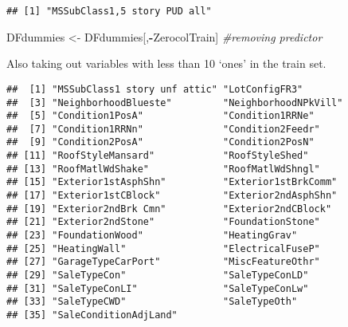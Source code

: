 \documentclass[]{article}
\newenvironment{Shaded}{\begin{snugshade}}{\end{snugshade}}
\newcommand{\CommentTok}[1]{\textcolor[rgb]{0.56,0.35,0.01}{\textit{#1}}}
\newcommand{\DecValTok}[1]{\textcolor[rgb]{0.00,0.00,0.81}{#1}}
\newcommand{\KeywordTok}[1]{\textcolor[rgb]{0.13,0.29,0.53}{\textbf{#1}}}
\newcommand{\NormalTok}[1]{#1}
\newcommand{\OperatorTok}[1]{\textcolor[rgb]{0.81,0.36,0.00}{\textbf{#1}}}
\newcommand{\StringTok}[1]{\textcolor[rgb]{0.31,0.60,0.02}{#1}}
\begin{document}
\begin{Shaded}
\end{Shaded}

\begin{verbatim}
## [1] "MSSubClass1,5 story PUD all"
\end{verbatim}

\begin{Shaded}
\begin{Highlighting}[]
\NormalTok{DFdummies <-}\StringTok{ }\NormalTok{DFdummies[,}\OperatorTok{-}\NormalTok{ZerocolTrain] }\CommentTok{#removing predictor}
\end{Highlighting}
\end{Shaded}

Also taking out variables with less than 10 `ones' in the train set.

\begin{Shaded}
\end{Shaded}

\begin{verbatim}
##  [1] "MSSubClass1 story unf attic" "LotConfigFR3"               
##  [3] "NeighborhoodBlueste"         "NeighborhoodNPkVill"        
##  [5] "Condition1PosA"              "Condition1RRNe"             
##  [7] "Condition1RRNn"              "Condition2Feedr"            
##  [9] "Condition2PosA"              "Condition2PosN"             
## [11] "RoofStyleMansard"            "RoofStyleShed"              
## [13] "RoofMatlWdShake"             "RoofMatlWdShngl"            
## [15] "Exterior1stAsphShn"          "Exterior1stBrkComm"         
## [17] "Exterior1stCBlock"           "Exterior2ndAsphShn"         
## [19] "Exterior2ndBrk Cmn"          "Exterior2ndCBlock"          
## [21] "Exterior2ndStone"            "FoundationStone"            
## [23] "FoundationWood"              "HeatingGrav"                
## [25] "HeatingWall"                 "ElectricalFuseP"            
## [27] "GarageTypeCarPort"           "MiscFeatureOthr"            
## [29] "SaleTypeCon"                 "SaleTypeConLD"              
## [31] "SaleTypeConLI"               "SaleTypeConLw"              
## [33] "SaleTypeCWD"                 "SaleTypeOth"                
## [35] "SaleConditionAdjLand"
\end{verbatim}
\end{document}
